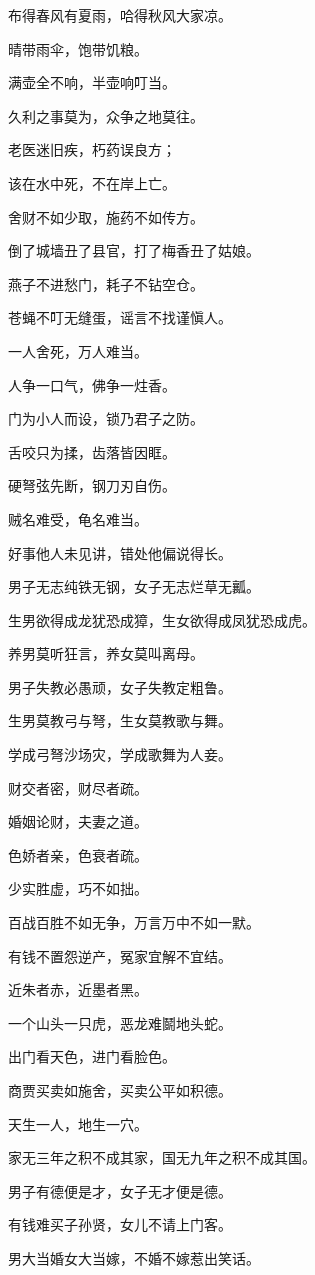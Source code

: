 \documentclass[12pt,oneside]{book}
\begin{document}
布得春风有夏雨，哈得秋风大家凉。

晴带雨伞，饱带饥粮。

满壶全不响，半壶响叮当。

久利之事莫为，众争之地莫往。

老医迷旧疾，朽药误良方；

该在水中死，不在岸上亡。

舍财不如少取，施药不如传方。

倒了城墙丑了县官，打了梅香丑了姑娘。

燕子不进愁门，耗子不钻空仓。

苍蝇不叮无缝蛋，谣言不找谨愼人。

一人舍死，万人难当。

人争一口气，佛争一炷香。

门为小人而设，锁乃君子之防。

舌咬只为揉，齿落皆因眶。

硬弩弦先断，钢刀刃自伤。

贼名难受，龟名难当。

好事他人未见讲，错处他偏说得长。

男子无志纯铁无钢，女子无志烂草无瓤。

生男欲得成龙犹恐成獐，生女欲得成凤犹恐成虎。

养男莫听狂言，养女莫叫离母。

男子失教必愚顽，女子失教定粗鲁。

生男莫教弓与弩，生女莫教歌与舞。

学成弓弩沙场灾，学成歌舞为人妾。

财交者密，财尽者疏。

婚姻论财，夫妻之道。

色娇者亲，色衰者疏。

少实胜虚，巧不如拙。

百战百胜不如无争，万言万中不如一默。

有钱不置怨逆产，冤家宜解不宜结。

近朱者赤，近墨者黑。

一个山头一只虎，恶龙难鬬地头蛇。

出门看天色，进门看脸色。

商贾买卖如施舍，买卖公平如积德。

天生一人，地生一穴。

家无三年之积不成其家，国无九年之积不成其国。

男子有德便是才，女子无才便是德。

有钱难买子孙贤，女儿不请上门客。

男大当婚女大当嫁，不婚不嫁惹出笑话。
\end{document}
